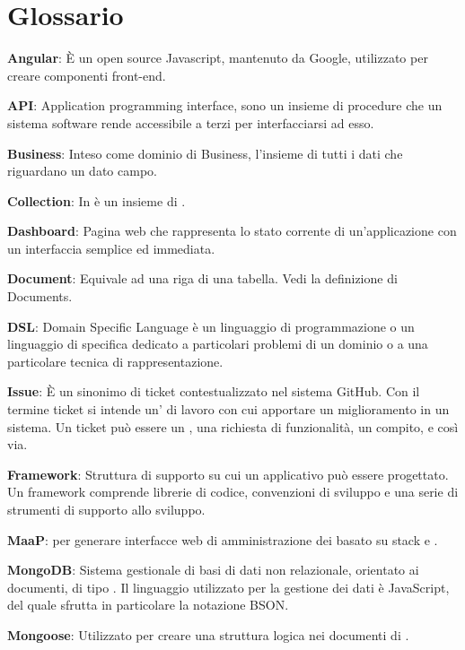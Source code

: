 \section{Glossario}

\textbf{Angular}: È un  open source Javascript, mantenuto da Google, utilizzato per creare componenti front-end.

\textbf{API}: Application programming interface, sono un insieme di procedure che un sistema software rende accessibile a terzi per interfacciarsi ad esso.

\textbf{Business}: Inteso come dominio di Business, l'insieme di tutti i dati che riguardano un dato campo.

\textbf{Collection}: In  è un insieme di .

\textbf{Dashboard}: Pagina web che rappresenta lo stato corrente di un'applicazione con un interfaccia semplice ed immediata.

\textbf{Document}: Equivale ad una riga di una tabella. Vedi la definizione di Documents.

\textbf{DSL}: Domain Specific Language è un linguaggio di programmazione o un linguaggio di specifica dedicato a particolari problemi di un dominio o a una particolare tecnica di rappresentazione.

\textbf{Issue}: È un sinonimo di ticket contestualizzato nel sistema GitHub. Con il termine ticket si intende un' di lavoro con cui apportare un miglioramento in un sistema. Un ticket può essere un , una richiesta di funzionalità, un compito, e così via.

\textbf{Framework}: Struttura di supporto su cui un applicativo può essere progettato. Un framework comprende librerie di codice, convenzioni di sviluppo e una serie di strumenti di supporto allo sviluppo.

\textbf{MaaP}:  per generare interfacce web di amministrazione dei  basato su stack  e .

\textbf{MongoDB}: Sistema gestionale di basi di dati non relazionale, orientato ai documenti, di tipo . Il linguaggio utilizzato per la gestione dei dati è JavaScript, del quale sfrutta in particolare la notazione BSON.

\textbf{Mongoose}: Utilizzato per creare una struttura logica nei documenti di .


